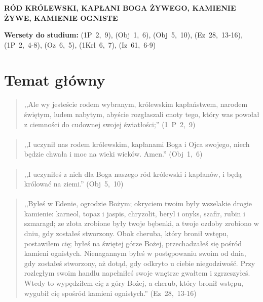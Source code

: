 \documentclass[10pt,a4paper,oneside]{article}
\begin{document}
\centerline{\textbf{\MakeUppercase{Ród Królewski, Kapłani Boga Żywego, Kamienie Żywe, Kamienie Ogniste}}}
\begin{center}
\textbf{Wersety do studium:} \mbox{(1P 2, 9)}, \mbox{(Obj 1, 6)}, \mbox{(Obj 5, 10)}, \mbox{(Ez 28, 13-16)}, \mbox{(1P 2, 4-8)}, \mbox{(Oz 6, 5)}, \mbox{(1Krl 6, 7)}, \mbox{(Iz 61, 6-9)}
\end{center}
\section{Temat główny}
\paragraph{}
\begin{quote}
,,Ale wy jesteście rodem wybranym, królewskim kapłaństwem, narodem świętym, ludem nabytym, abyście rozgłaszali cnoty tego, który was powołał z ciemności do cudownej swojej światłości;'' \mbox{(1 P 2, 9)}
\end{quote}
\paragraph{}
\begin{quote}
,,I uczynił nas rodem królewskim, kapłanami Boga i Ojca swojego, niech będzie chwała i moc na wieki wieków. Amen.'' \mbox{(Obj 1, 6)}
\end{quote}
\paragraph{}
\begin{quote}
,,I uczyniłeś z nich dla Boga naszego ród królewski i kapłanów, i będą królować na ziemi.'' \mbox{(Obj 5, 10)}
\end{quote}
\paragraph{}
\begin{quote}
,,Byłeś w Edenie, ogrodzie Bożym; okryciem twoim były wszelakie drogie kamienie: karneol, topaz i jaspis, chryzolit, beryl i onyks, szafir, rubin i szmaragd; ze złota zrobione były twoje bębenki, a twoje ozdoby zrobiono w dniu, gdy zostałeś stworzony. Obok cheruba, który bronił wstępu, postawiłem cię; byłeś na świętej górze Bożej, przechadzałeś się pośród kamieni ognistych. Nienagannym byłeś w postępowaniu swoim od dnia, gdy zostałeś stworzony, aż dotąd, gdy odkryto u ciebie niegodziwość. Przy rozległym swoim handlu napełniłeś swoje wnętrze gwałtem i zgrzeszyłeś. Wtedy to wypędziłem cię z góry Bożej, a cherub, który bronił wstępu, wygubił cię spośród kamieni ognistych.'' \mbox{(Ez 28, 13-16)}
\end{quote}
\end{document}
